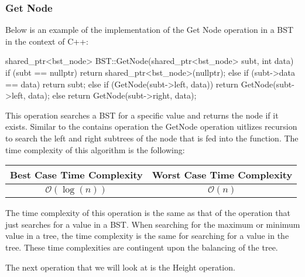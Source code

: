\begin{highlight}

\subsubsection*{Get Node}

Below is an example of the implementation of the Get Node operation in a BST in the context of C++:

\begin{code}
shared_ptr<bst_node> BST::GetNode(shared_ptr<bst_node> subt, int data){
    if (subt == nullptr) {
        return shared_ptr<bst_node>(nullptr);
    }
    else if (subt->data == data) {
        return subt;
    }
    else {
        if (GetNode(subt->left, data)) {
            return GetNode(subt->left, data);
        }
        else {
            return GetNode(subt->right, data);
        }
    }
}
\end{code}

This operation searches a BST for a specific value and returns the node if it exists. Similar to the contains operation the GetNode operation uitlizes recursion to search the left and right subtrees
of the node that is fed into the function. The time complexity of this algorithm is the following: \newline

\begin{center}
    \begin{tabular}[ht]{|c|c|}
        \hline \textbf{Best Case Time Complexity} & \textbf{Worst Case Time Complexity} \\ \hline
        $\mathcal{O}(\log{(n)})$ & $\mathcal{O}(n)$ \\ \hline
    \end{tabular}
\end{center}

\noindent The time complexity of this operation is the same as that of the operation that just searches for a value in a BST. When searching for the maximum or minimum value in a tree, the time complexity
is the same for searching for a value in the tree. These time complexities are contingent upon the balancing of the tree.

\end{highlight}

The next operation that we will look at is the Height operation.

